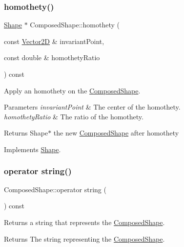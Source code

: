 \subsubsection{\texorpdfstring{homothety()}{homothety()}}
{\footnotesize\ttfamily \hyperlink{class_shape}{Shape} $\ast$ Composed\+Shape\+::homothety (\begin{DoxyParamCaption}\item[{const \hyperlink{class_vector2_d}{Vector2D} \&}]{invariant\+Point,  }\item[{const double \&}]{homothety\+Ratio }\end{DoxyParamCaption}) const\hspace{0.3cm}{\ttfamily [virtual]}}

Apply an homothety on the \hyperlink{class_composed_shape}{Composed\+Shape}. 
\begin{DoxyParams}{Parameters}
{\em invariant\+Point} & The center of the homothety. \\
\hline
{\em homothety\+Ratio} & The ratio of the homothety. \\
\hline
\end{DoxyParams}
\begin{DoxyReturn}{Returns}
Shape$\ast$ the new \hyperlink{class_composed_shape}{Composed\+Shape} after homothety 
\end{DoxyReturn}


Implements \hyperlink{class_shape_a91f18af3004ba210db5c91084c50beb9}{Shape}.

\hypertarget{class_composed_shape_aef491963b0e58209d1921973f2711c94}{}\label{class_composed_shape_aef491963b0e58209d1921973f2711c94} 
\subsubsection{\texorpdfstring{operator string()}{operator string()}}
{\footnotesize\ttfamily Composed\+Shape\+::operator string (\begin{DoxyParamCaption}{ }\end{DoxyParamCaption}) const\hspace{0.3cm}{\ttfamily [virtual]}}

Returns a string that represents the \hyperlink{class_composed_shape}{Composed\+Shape}. \begin{DoxyReturn}{Returns}
The string representing the \hyperlink{class_composed_shape}{Composed\+Shape}. 
\end{DoxyReturn}


